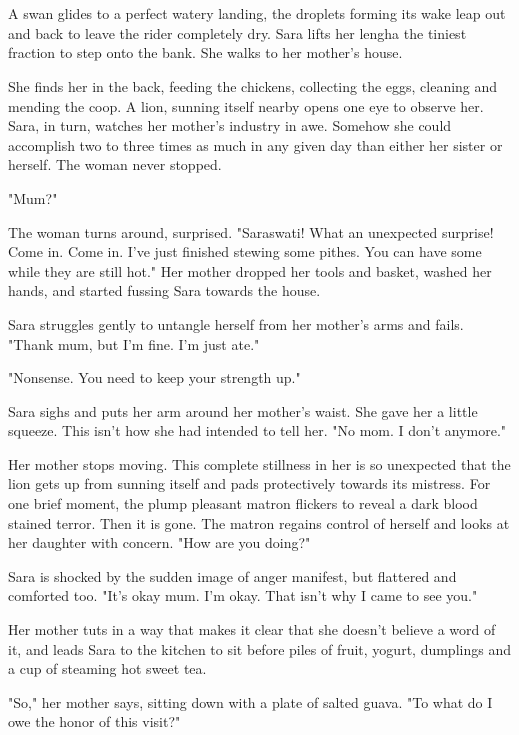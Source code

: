 \documentclass{article}
\begin{document}
\section{}
A swan glides to a perfect watery landing, the droplets forming its wake leap out and back to leave the rider completely dry. Sara lifts her lengha the tiniest fraction to step onto the bank. She walks to her mother's house.

She finds her in the back, feeding the chickens, collecting the eggs, cleaning and mending the coop. A lion, sunning itself nearby opens one eye to observe her. Sara, in turn, watches her mother's industry in awe. Somehow she could accomplish two to three times as much in any given day than either her sister or herself. The woman never stopped. 

"Mum?"

The woman turns around, surprised. "Saraswati! What an unexpected surprise! Come in. Come in. I've just finished stewing some pithes. You can have some while they are still hot." Her mother dropped her tools and basket, washed her hands, and started fussing Sara towards the house. 

Sara struggles gently to untangle herself from her mother's arms and fails. "Thank mum, but I'm fine. I'm just ate."

"Nonsense. You need to keep your strength up."

Sara sighs and puts her arm around her mother's waist. She gave her a little squeeze. This isn't how she had intended to tell her. "No mom. I don't anymore." 

Her mother stops moving. This complete stillness in her is so unexpected that the lion gets up from sunning itself and pads protectively towards its mistress. For one brief moment, the plump pleasant matron flickers to reveal a dark blood stained terror. Then it is gone. The matron regains control of herself and looks at her daughter with concern. "How are you doing?"

Sara is shocked by the sudden image of anger manifest, but flattered and comforted too. "It's okay mum. I'm okay. That isn't why I came to see you."

Her mother tuts in a way that makes it clear that she doesn't believe a word of it, and leads Sara to the kitchen to sit before piles of fruit, yogurt, dumplings and a cup of steaming hot sweet tea.

"So," her mother says, sitting down with a plate of salted guava. "To what do I owe the honor of this visit?"
\end{document}
